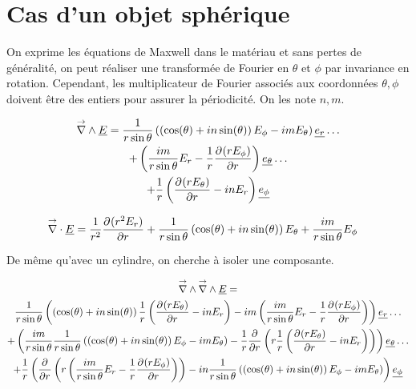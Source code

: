 \section{Cas d'un objet sphérique}

    On exprime les équations de Maxwell dans le matériau et sans pertes de généralité, on peut réaliser une transformée de Fourier en $\theta$ et $\phi$ par invariance en rotation. Cependant, les multiplicateur de Fourier associés aux coordonnées $\theta,\phi$ doivent être des entiers pour assurer la périodicité. On les note $n,m$.

    \begin{multline}
        \vrot \v{E} = \frac{1}{r\sin\theta}\left(\left(\cos(\theta) + in\sin(\theta)\right)E_\phi - im E_\theta\right)\v{e_r}\dots 
        \\
        + \left(\frac{im}{r\sin\theta}E_r - \frac{1}{r}\ddr{r}{(rE_\phi)} \right)\v{e_\theta} \dots
        \\
        + \frac{1}{r}\left(\ddr{r}{(rE_\theta)}-inE_r\right)\v{e_\phi}
    \end{multline}

    \begin{align}
        \vdiv \v{E} &= \frac{1}{r^2}\ddr{r}{(r^2E_r)}
        + \frac{1}{r\sin\theta}\left(\cos(\theta) + in\sin(\theta)\right)E_\theta + \frac{im}{r\sin\theta}{E_\phi}
    \end{align}

    De même qu'avec un cylindre, on cherche à isoler une composante.

    \begin{multline}
        \vrot \vrot \v{E} = \\
        \frac{1}{r\sin\theta}\left(\left(\cos(\theta) + in\sin(\theta)\right)\frac{1}{r}\left(\ddr{r}{(rE_\theta)}-inE_r\right) - im \left(\frac{im}{r\sin\theta}E_r - \frac{1}{r}\ddr{r}{(rE_\phi)} \right)\right)\v{e_r}\dots 
        \\
        + \left(\frac{im}{r\sin\theta}\frac{1}{r\sin\theta}\left(\left(\cos(\theta) + in\sin(\theta)\right)E_\phi - im E_\theta\right) - \frac{1}{r}\ddr{r}{}\left(r \frac{1}{r}\left(\ddr{r}{(rE_\theta)}-inE_r\right)\right) \right)\v{e_\theta} \dots
        \\
        + \frac{1}{r}\left(\ddr{r}{}\left(r \left(\frac{im}{r\sin\theta}E_r - \frac{1}{r}\ddr{r}{(rE_\phi)} \right)\right)-in\frac{1}{r\sin\theta}\left(\left(\cos(\theta) + in\sin(\theta)\right)E_\phi - im E_\theta\right)\right)\v{e_\phi}
    \end{multline}
